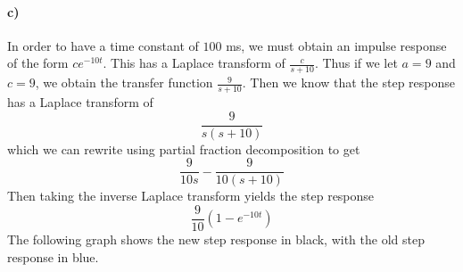 \documentclass[12pt]{article}
\begin{document}
\paragraph{c)}

In order to have a time constant of \(100\) ms, we must obtain an impulse response of the form \(ce^{-10t}\). This has a Laplace transform of \(\frac{c}{s+10}\).
Thus if we let \(a=9\) and \(c=9\), we obtain the transfer function \(\frac{9}{s+10}\). Then we know that the step response has a Laplace transform of
\[\frac{9}{s(s+10)}\]
which we can rewrite using partial fraction decomposition to get
\[\frac{9}{10s}-\frac{9}{10(s+10)}\]
Then taking the inverse Laplace transform yields the step response
\[\frac{9}{10}(1-e^{-10t})\]
The following graph shows the new step response in black, with the old step response in blue.
\begin{center}
\end{center}
\end{document}
